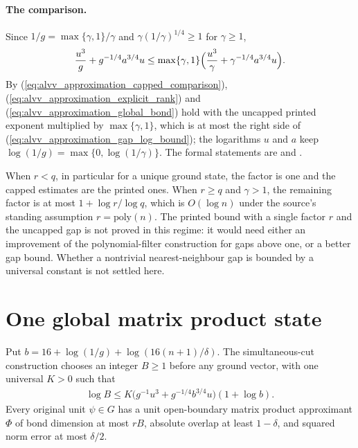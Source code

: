 \documentclass{article}
\begin{document}
\paragraph{The comparison.} Since $1/g=\max\{\gamma,1\}/\gamma$ and
$\gamma(1/\gamma)^{1/4}\ge1$ for $\gamma\ge1$,
\begin{align}
    \frac{u^3}{g}+g^{-1/4}a^{3/4}u
    \le\max\{\gamma,1\}\Bigl(\frac{u^3}{\gamma}
    +\gamma^{-1/4}a^{3/4}u\Bigr).
    \label{eq:alvv_approximation_capped_comparison}
\end{align}
By (\ref{eq:alvv_approximation_capped_comparison}),
(\ref{eq:alvv_approximation_explicit_rank}) and
(\ref{eq:alvv_approximation_global_bond}) hold with the uncapped printed
exponent multiplied by $\max\{\gamma,1\}$, which is at most the right side
of (\ref{eq:alvv_approximation_gap_log_bound}); the logarithms
$u$ and $a$ keep $\log(1/g)=\max\{0,\log(1/\gamma)\}$. The formal statements
are
and
.

When $r<q$, in particular for a unique ground state, the factor is one and
the capped estimates are the printed ones. When $r\ge q$ and $\gamma>1$, the
remaining factor is at most $1+\log r/\log q$, which is $O(\log n)$ under the
source's standing assumption $r=\mathrm{poly}(n)$. The printed bound with a
single factor $r$ and the uncapped gap is not proved in this regime: it would
need either an improvement of the polynomial-filter construction for gaps
above one, or a better gap bound. Whether a nontrivial nearest-neighbour gap
is bounded by a universal constant is not settled here.

\section{One global matrix product state}

Put $b=16+\log(1/g)+\log(16(n+1)/\delta)$.
The simultaneous-cut construction chooses an integer $B\ge1$ before
any ground vector, with one universal $K>0$ such that
\begin{align}
    \log B \le K\bigl(g^{-1}u^3+g^{-1/4}b^{3/4}u\bigr)(1+\log b).
    \label{eq:alvv_approximation_global_bond}
\end{align}
Every original unit $\psi\in G$ has a unit open-boundary matrix product
approximant $\Phi$ of bond dimension at most $rB$, absolute overlap at least
$1-\delta$, and squared norm error at most $\delta/2$.
\end{document}
